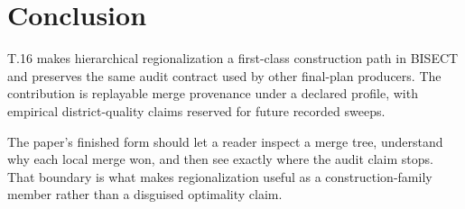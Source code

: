 \section{Conclusion}

T.16 makes hierarchical regionalization a first-class construction path in
BISECT and preserves the same audit contract used by other final-plan
producers. The contribution is replayable merge provenance under a declared
profile, with empirical district-quality claims reserved for future recorded
sweeps.

The paper's finished form should let a reader inspect a merge tree, understand
why each local merge won, and then see exactly where the audit claim stops. That
boundary is what makes regionalization useful as a construction-family member
rather than a disguised optimality claim.
